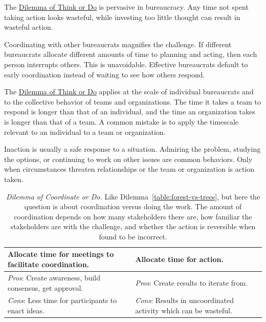 The \href{table:forest-vs-trees}{Dilemma of Think or Do} is pervasive in bureaucracy. Any time not spent taking action looks wasteful, while investing too little thought can result in wasteful action. 

Coordinating with other bureaucrats magnifies the challenge. If different bureaucrats allocate different amounts of time to planning and acting, then each person interrupts others. This is unavoidable. Effective bureaucrats default to early coordination instead of waiting to see how others respond.

The \href{table:forest-vs-trees}{Dilemma of Think or Do} applies at the scale of individual bureaucrats and to the collective behavior of teams and organizations. The time it takes a team to respond is longer than that of an individual, and the time an organization takes is longer than that of a team.  A common mistake is to apply the timescale relevant to an individual to a team or organization.

Inaction is usually a safe response to a situation. Admiring the problem, studying the options, or continuing to work on other issues are common behaviors. Only when circumstances threaten relationships or the team or organization is action taken.

\begin{center}
\begin{table}[H] %
\begin{tabular}{ | m{\dilemmatablewidth}| m{\dilemmatablewidth} | } 
  \hline
  \textbf{Allocate time for meetings to facilitate coordination.} &
  \textbf{Allocate time for action.} \\
  \hline
  \textit{Pros}: Create awareness, build consensus, get approval. &
  \textit{Pros}: Create results to iterate from. \\
  \hline
  \textit{Cons}: Less time for participants to enact ideas. & 
  \textit{Cons}: Results in uncoordinated activity which can be wasteful. \\
  \hline
\end{tabular}
\caption{\textit{Dilemma of Coordinate or Do.}
Like Dilemma~\ref{table:forest-vs-trees}, but here the question is about coordination versus doing the work. The amount of coordination depends on how many stakeholders there are, how familiar the stakeholders are with the challenge, and whether the action is reversible when found to be incorrect.
}
\label{table:meetings-versus-work}
\end{table}
\end{center}

